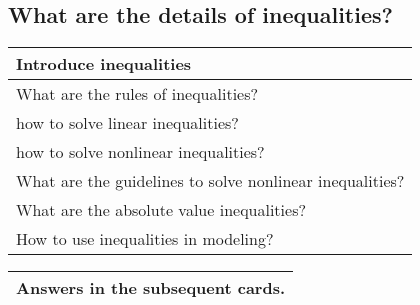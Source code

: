 \subsection{What are the details of inequalities?}
\begin{small}
    \begin{tabularx}{1\textwidth}{
            p{}
        }
        \toprule

        Introduce inequalities
        \\
        \midrule

        What are the rules of inequalities?
        \\
        \midrule

        how to solve linear inequalities?
        \\
        \midrule

        how to solve nonlinear inequalities?
        \\
        \midrule

        What are the guidelines to solve nonlinear inequalities?
        \\
        \midrule

        What are the absolute value inequalities?
        \\
        \midrule

        How to use inequalities in modeling?
        \\
        \midrule

        \bottomrule
    \end{tabularx}
\end{small}
\begin{small}
    \begin{tabularx}{1\textwidth}{
            p{}
        }
        \toprule
        Answers in the subsequent cards.
        \\
        \bottomrule
    \end{tabularx}
\end{small}
